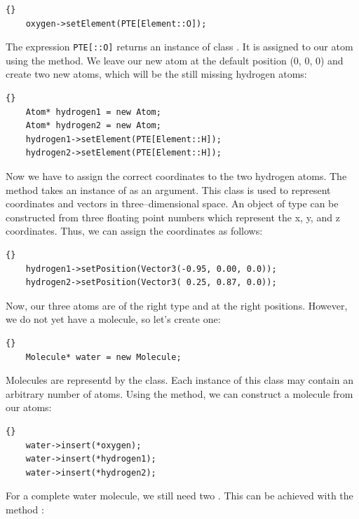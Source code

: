 \begin{lstlisting}{}
	oxygen->setElement(PTE[Element::O]);
\end{lstlisting}

\noindent
The expression {\tt PTE[::O]} returns an instance of class
. It is assigned to our atom using the 
method. We leave our new atom at the default position (0, 0, 0) and create two
new atoms, which will be the still missing hydrogen atoms:

\begin{lstlisting}{}
	Atom* hydrogen1 = new Atom;
	Atom* hydrogen2 = new Atom;
	hydrogen1->setElement(PTE[Element::H]);
	hydrogen2->setElement(PTE[Element::H]);
\end{lstlisting}
	
\noindent
Now we have to assign the correct coordinates to the two hydrogen atoms.  The
method  takes an instance of  as an
argument. This class is used to represent coordinates and vectors in
three--dimensional space. An object of type  can be constructed
from three floating point numbers which represent the x, y, and z coordinates.
Thus, we can assign the coordinates as follows:
 
\begin{lstlisting}{}
 	hydrogen1->setPosition(Vector3(-0.95, 0.00, 0.0));
 	hydrogen2->setPosition(Vector3( 0.25, 0.87, 0.0));
\end{lstlisting}

\noindent

Now, our three atoms are of the right type and at the right positions. However, we
do not yet have a molecule, so let's create one:\\

\begin{lstlisting}{}
	Molecule* water = new Molecule;
\end{lstlisting}

\noindent
Molecules are representd by the  class. Each instance of this
class may contain an arbitrary number of atoms. Using the 
method, we can construct a molecule from our atoms:

\begin{lstlisting}{}
	water->insert(*oxygen);
	water->insert(*hydrogen1);
	water->insert(*hydrogen2);
\end{lstlisting}

\noindent
For a complete water molecule, we still need two . This can be
achieved with the method :
	
